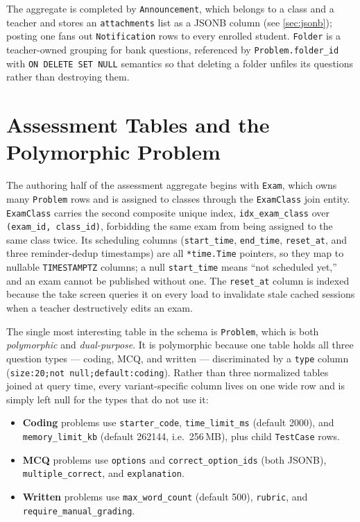 The aggregate is completed by \texttt{Announcement}, which belongs to a class
and a teacher and stores an \texttt{attachments} list as a JSONB column (see
\cref{sec:jsonb}); posting one fans out \texttt{Notification} rows to every
enrolled student. \texttt{Folder} is a teacher-owned grouping for bank
questions, referenced by \texttt{Problem.folder\_id} with
\texttt{ON DELETE SET NULL} semantics so that deleting a folder unfiles its
questions rather than destroying them.

\section{Assessment Tables and the Polymorphic Problem}

The authoring half of the assessment aggregate begins with \texttt{Exam},
which owns many \texttt{Problem} rows and is assigned to classes through the
\texttt{ExamClass} join entity. \texttt{ExamClass} carries the second
composite unique index, \texttt{idx\_exam\_class} over \texttt{(exam\_id,
class\_id)}, forbidding the same exam from being assigned to the same class
twice. Its scheduling columns (\texttt{start\_time}, \texttt{end\_time},
\texttt{reset\_at}, and three reminder-dedup timestamps) are all
\texttt{*time.Time} pointers, so they map to nullable \texttt{TIMESTAMPTZ}
columns; a null \texttt{start\_time} means ``not scheduled yet,'' and an exam
cannot be published without one. The \texttt{reset\_at} column is indexed
because the take screen queries it on every load to invalidate stale cached
sessions when a teacher destructively edits an exam.

The single most interesting table in the schema is \texttt{Problem}, which is
both \emph{polymorphic} and \emph{dual-purpose}. It is polymorphic because
one table holds all three question types --- coding, MCQ, and written ---
discriminated by a \texttt{type} column (\texttt{size:20;not
null;default:coding}). Rather than three normalized tables joined at query
time, every variant-specific column lives on one wide row and is simply left
null for the types that do not use it:

\begin{itemize}[nosep]
  \item \textbf{Coding} problems use \texttt{starter\_code},
        \texttt{time\_limit\_ms} (default 2000), and
        \texttt{memory\_limit\_kb} (default 262144, i.e.\ 256\,MB), plus
        child \texttt{TestCase} rows.
  \item \textbf{MCQ} problems use \texttt{options} and
        \texttt{correct\_option\_ids} (both JSONB), \texttt{multiple\_correct},
        and \texttt{explanation}.
  \item \textbf{Written} problems use \texttt{max\_word\_count} (default 500),
        \texttt{rubric}, and \texttt{require\_manual\_grading}.
\end{itemize}

